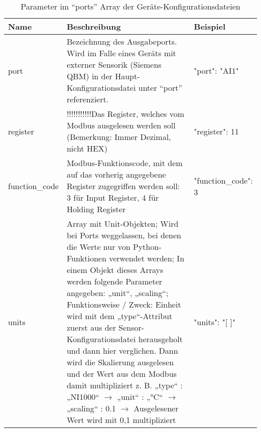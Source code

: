 \begin{enumerate}
	\begin{table}[H]
		\caption{Parameter im \enquote{ports} Array der Geräte-Konfigurationsdateien}
		\label{tab:ports_array_parameter}
		\begin{tabular}{p{} p{} | p{}}
			\toprule
			\textbf{Name} & \textbf{Beschreibung} & \textbf{Beispiel} \\
			\midrule
			port      	& Bezeichnung des Ausgabeports. Wird im Falle eines Geräts mit externer Sensorik (\zB Siemens QBM) in der Haupt-Konfigurationsdatei unter \enquote{port} referenziert. & 
			\begin{jsonTable}
"port": "AI1"
			\end{jsonTable} 
			\\
			register 	& !!!!!!!!!!!Das Register, welches vom Modbus ausgelesen werden soll (Bemerkung: Immer Dezimal, nicht HEX) & 
			\begin{jsonTable}
"register": 11
			\end{jsonTable} 
			\\
			function\_code 	& Modbus-Funktionscode, mit dem auf das vorherig angegebene Register zugegriffen werden soll: 3 für Input Register, 4 für Holding Register & 
			\begin{jsonTable}
"function_code": 3
			\end{jsonTable} 
			\\
			units 	& Array mit Unit-Objekten; Wird bei Ports weggelassen, bei denen die Werte nur von Python-Funktionen verwendet werden; In einem Objekt dieses Arrays werden folgende Parameter angegeben: „unit“, „scaling“; Funktionsweise / Zweck: Einheit wird mit dem „type“-Attribut zuerst aus der Sensor-Konfigurationsdatei herausgeholt und dann hier verglichen. Dann wird die Skalierung ausgelesen und der Wert aus dem Modbus damit multipliziert
			z. B. „type“ : „NI1000“ $\rightarrow$ „unit“ : „°C“ $\rightarrow$ „scaling“ : 0.1 $\rightarrow$ Ausgelesener Wert wird mit 0,1 multipliziert & 
			\begin{jsonTable}
"units": "[ ]"
			\end{jsonTable} 
			\\
			\bottomrule
		\end{tabular}
	\end{table}
	

\end{enumerate}
